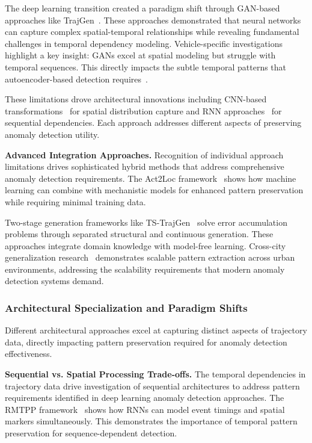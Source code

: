 \documentclass[runningheads]{llncs}
\begin{document}
The deep learning transition created a paradigm shift through GAN-based approaches like TrajGen~\cite{cao2021generating}. These approaches demonstrated that neural networks can capture complex spatial-temporal relationships while revealing fundamental challenges in temporal dependency modeling. Vehicle-specific investigations~\cite{bajarunas2022generative} highlight a key insight: GANs excel at spatial modeling but struggle with temporal sequences. This directly impacts the subtle temporal patterns that autoencoder-based detection requires~\cite{huang2021lstm}.

These limitations drove architectural innovations including CNN-based transformations~\cite{merhi2024synthetic} for spatial distribution capture and RNN approaches~\cite{du2016recurrent} for sequential dependencies. Each approach addresses different aspects of preserving anomaly detection utility.

\textbf{Advanced Integration Approaches.} Recognition of individual approach limitations drives sophisticated hybrid methods that address comprehensive anomaly detection requirements. The Act2Loc framework~\cite{liu2023act2loc} shows how machine learning can combine with mechanistic models for enhanced pattern preservation while requiring minimal training data.

Two-stage generation frameworks like TS-TrajGen~\cite{jiang2023continuous} solve error accumulation problems through separated structural and continuous generation. These approaches integrate domain knowledge with model-free learning. Cross-city generalization research~\cite{wang2025gtg} demonstrates scalable pattern extraction across urban environments, addressing the scalability requirements that modern anomaly detection systems demand.

\subsubsection{Architectural Specialization and Paradigm Shifts}

Different architectural approaches excel at capturing distinct aspects of trajectory data, directly impacting pattern preservation required for anomaly detection effectiveness.

\textbf{Sequential vs. Spatial Processing Trade-offs.} The temporal dependencies in trajectory data drive investigation of sequential architectures to address pattern requirements identified in deep learning anomaly detection approaches. The RMTPP framework~\cite{du2016recurrent} shows how RNNs can model event timings and spatial markers simultaneously. This demonstrates the importance of temporal pattern preservation for sequence-dependent detection.
\end{document}
